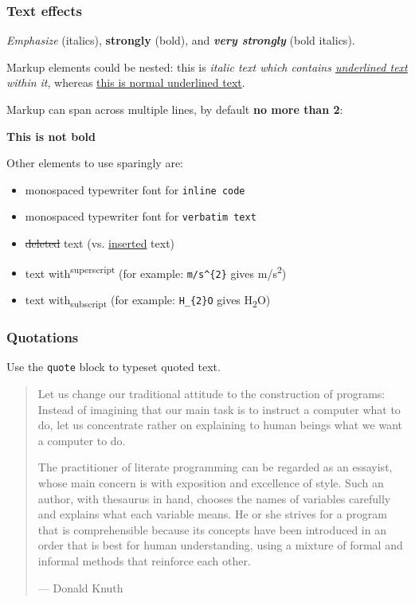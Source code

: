 \documentclass[11pt]{article}
\begin{document}
\subsubsection*{Text effects}
\label{sec:org5c40bc8}

\emph{Emphasize} (italics), \textbf{strongly} (bold), and \textbf{\emph{very strongly}} (bold italics).

Markup elements could be nested: this is \emph{italic text which contains
\uline{underlined text} within it}, whereas \uline{this is normal underlined text}.

Markup can span across multiple lines, by default \textbf{no more than 2}:

\textbf{This
is not
bold}

Other elements to use sparingly are:
\begin{itemize}
\item monospaced typewriter font for \texttt{inline code}
\item monospaced typewriter font for \texttt{verbatim text}
\item \sout{deleted} text (vs. \uline{inserted} text)
\item text with\textsuperscript{superscript} (for example: \texttt{m/s\textasciicircum{}\{2\}} gives m/s\textsuperscript{2})
\item text with\textsubscript{subscript} (for example: \texttt{H\_\{2\}O} gives H\textsubscript{2}O)
\end{itemize}

\subsubsection*{Quotations}
\label{sec:org8d518f1}

Use the \texttt{quote} block to typeset quoted text.

\begin{quote}
Let us change our traditional attitude to the construction of programs:
Instead of imagining that our main task is to instruct a computer what to do,
let us concentrate rather on explaining to human beings what we want a
computer to do.

The practitioner of literate programming can be regarded as an essayist, whose
main concern is with exposition and excellence of style. Such an author, with
thesaurus in hand, chooses the names of variables carefully and explains what
each variable means. He or she strives for a program that is comprehensible
because its concepts have been introduced in an order that is best for human
understanding, using a mixture of formal and informal methods that reinforce
each other.

--- Donald Knuth
\end{quote}
\end{document}

